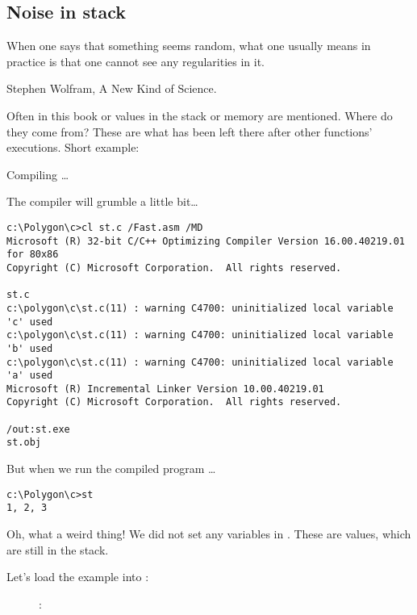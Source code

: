 \subsection{Noise in stack}

\epigraph{When one says that something seems random, what one usually
means in practice is that one cannot see any regularities in it.}{Stephen Wolfram, A New Kind of Science.}

Often in this book  or  values in the stack or memory are mentioned.
Where do they come from?
These are what has been left there after other functions' executions.
Short example:



Compiling \dots



The compiler will grumble a little bit\dots

\begin{lstlisting}
c:\Polygon\c>cl st.c /Fast.asm /MD
Microsoft (R) 32-bit C/C++ Optimizing Compiler Version 16.00.40219.01 for 80x86
Copyright (C) Microsoft Corporation.  All rights reserved.

st.c
c:\polygon\c\st.c(11) : warning C4700: uninitialized local variable 'c' used
c:\polygon\c\st.c(11) : warning C4700: uninitialized local variable 'b' used
c:\polygon\c\st.c(11) : warning C4700: uninitialized local variable 'a' used
Microsoft (R) Incremental Linker Version 10.00.40219.01
Copyright (C) Microsoft Corporation.  All rights reserved.

/out:st.exe
st.obj
\end{lstlisting}

But when we run the compiled program \dots

\begin{lstlisting}
c:\Polygon\c>st
1, 2, 3
\end{lstlisting}

Oh, what a weird thing! We did not set any variables in . 
These are  values, which are still in the stack.

\clearpage
Let's load the example into \olly:

\begin{figure}[H]
\centering
{}
\caption{\olly: }
\label{fig:stack_noise_olly1}
\end{figure}

